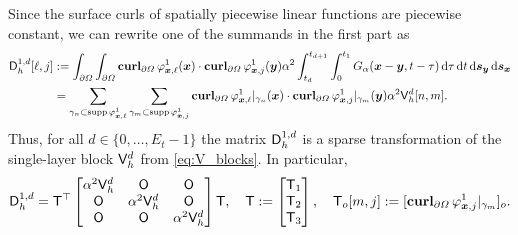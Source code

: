 \documentclass[a4paper,11pt]{article}
\begin{document}
Since the surface curls of spatially piecewise linear functions are piecewise constant, we can rewrite one of the summands in the first part as
\begin{align*}
  {\ensuremath{{\mathsf{D}}}}^{1,d}_h[\ell,j] &:= \int_{\partial\Omega} \int_{\partial\Omega}\operatorname{\mathbf{curl}}_{\partial\Omega} \varphi^1_{{{\bm{x}}},\ell}({{\bm{x}}}) \cdot \operatorname{\mathbf{curl}}_{\partial\Omega} \varphi^1_{{{\bm{x}}},j}({{\bm{y}}}) \alpha^2 \int_{t_{d}}^{t_{d+1}} \int_{0}^{t_1} G_\alpha({{\bm{x}}}-{{\bm{y}}},t-\tau) \,{\mathrm{d}}\tau \,{\mathrm{d}} t \,{\mathrm{d}}{{\bm{s}}}_{{\bm{y}}} \,{\mathrm{d}}{{\bm{s}}}_{{\bm{x}}} \\
  &= \sum_{\gamma_n \subset \operatorname{supp} \varphi^1_{{{\bm{x}}},\ell}} \sum_{\gamma_m \subset \operatorname{supp} \varphi^1_{{{\bm{x}}},j}} \operatorname{\mathbf{curl}}_{\partial\Omega} \varphi^1_{{{\bm{x}}},\ell}|_{\gamma_n}({{\bm{x}}}) \cdot \operatorname{\mathbf{curl}}_{\partial\Omega} \varphi^1_{{{\bm{x}}},j}|_{\gamma_m}({{\bm{y}}}) \alpha^2 {{\mathsf{V}}}_h^d[n,m].
\end{align*}
Thus, for all $d \in \{0,\ldots,E_t-1\}$ the matrix ${{\mathsf{D}}}_h^{1,d}$ is a sparse transformation of the single-layer block ${{\mathsf{V}}}^d_h$ from \eqref{eq:V_blocks}. In particular,
\begin{equation*}
  {\ensuremath{{\mathsf{D}}}}_h^{1,d} = {{\mathsf{T}}}^\top 
  \begin{bmatrix}
    \alpha^2{{\mathsf{V}}}^d_h & {{\mathsf{O}}} & {{\mathsf{O}}} \\
    {{\mathsf{O}}} & \alpha^2{{\mathsf{V}}}^d_h & {{\mathsf{O}}} \\
    {{\mathsf{O}}} & {{\mathsf{O}}} & \alpha^2{{\mathsf{V}}}^d_h
  \end{bmatrix}
  {\ensuremath{{\mathsf{T}}}},\quad
  {\ensuremath{{\mathsf{T}}}} :=
  \begin{bmatrix}
    {\ensuremath{{\mathsf{T}}}}_1 \\
    {{\mathsf{T}}}_2 \\
    {{\mathsf{T}}}_3
  \end{bmatrix},\quad
  {\ensuremath{{\mathsf{T}}}}_o[m,j] := [\operatorname{\mathbf{curl}}_{\partial\Omega} \varphi^1_{{{\bm{x}}},j}|_{\gamma_m}]_o.
\end{equation*}
\end{document}
